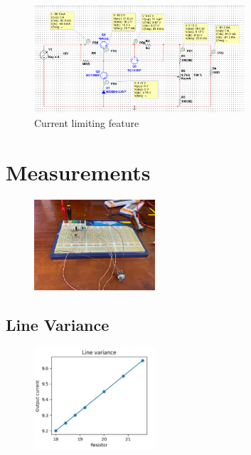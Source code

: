 \documentclass[12pt, a4paper]{article}
\begin{document}
\begin{figure}[h!]
\centering
    \includegraphics[width=0.7\textwidth]{during current limiting.png}
    \caption*{Current limiting feature}
\end{figure}

\section{Measurements}

\begin{figure}[h!]
\centering
    \includegraphics[width=0.4\textwidth]{our cct.jpg}
\end{figure}

\newpage
\subsection{Line Variance}

\begin{figure}[h!]
\centering
    \includegraphics[width=0.4\textwidth]{Line Variance.png}
\end{figure}
\end{document}
